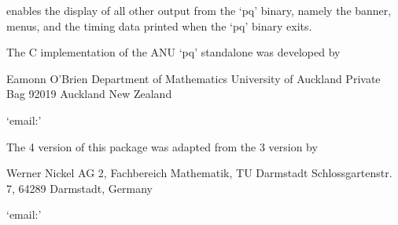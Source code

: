 enables the display of all other output from the `pq' binary, namely  the
banner, menus, and the timing data printed when the `pq' binary exits.


The C implementation of the ANU `pq' standalone was developed by

\begintt
Eamonn O'Brien
Department of Mathematics
University of Auckland
Private Bag 92019
Auckland
New Zealand
\endtt

{}`email:' 

The {\GAP} 4 version of this package was adapted from the {\GAP} 3
version by  

\begintt
Werner Nickel
AG 2, Fachbereich Mathematik, TU Darmstadt
Schlossgartenstr. 7, 64289 Darmstadt, Germany
\endtt

{}`email:' 

